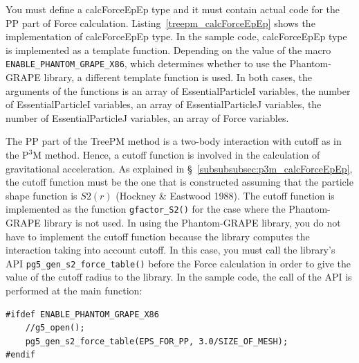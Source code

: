 

You must define a \textsf{calcForceEpEp} type and it must contain actual code for the PP part of Force calculation. Listing~\ref{treepm_calcForceEpEp} shows the implementation of \textsf{calcForceEpEp} type. In the sample code, \textsf{calcForceEpEp} type is implemented as a template function. Depending on the value of the macro \texttt{ENABLE\_PHANTOM\_GRAPE\_X86}, which determines whether to use the Phantom-GRAPE library, a different template function is used. In both cases, the arguments of the functions is an array of \textsf{EssentialParticleI} variables, the number of \textsf{EssentialParticleI} variables, an array of \textsf{EssentialParticleJ} variables, the number of \textsf{EssentialParticleJ} variables, an array of \textsf{Force} variables.



The PP part of the TreePM method is a two-body interaction with cutoff as in the $\mathrm{P^{3}M}$ method. Hence, a cutoff function is involved in the calculation of gravitational acceleration. As explained in \S~\ref{subsubsubsec:p3m_calcForceEpEp}, the cutoff function must be the one that is constructed assuming that the particle shape function is $S2(r)$ (Hockney \& Eastwood 1988). The cutoff function is implemented as the function \texttt{gfactor\_S2()} for the case where the Phantom-GRAPE library is not used. In using the Phantom-GRAPE library, you do not have to implement the cutoff function because the library computes the interaction taking into account cutoff. In this case, you must call the library's API \texttt{pg5\_gen\_s2\_force\_table()} before the Force calculation in order to give the value of the cutoff radius to the library. In the sample code, the call of the API is performed at the main function:
\begin{lstlisting}
#ifdef ENABLE_PHANTOM_GRAPE_X86 
    //g5_open();
    pg5_gen_s2_force_table(EPS_FOR_PP, 3.0/SIZE_OF_MESH);
#endif
\end{lstlisting}

